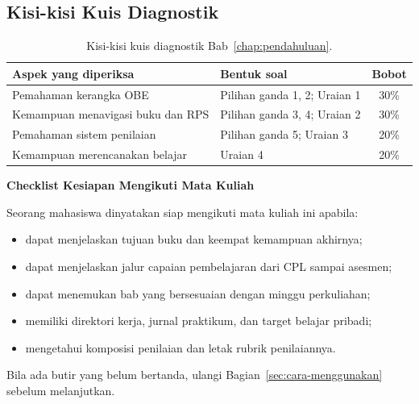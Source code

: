 \subsection{Kisi-kisi Kuis Diagnostik}

\begin{table}[H]
    \centering
    \caption{Kisi-kisi kuis diagnostik Bab~\ref{chap:pendahuluan}.}
    \label{tab:kisi-bab1}
    \small
    \begin{tabular}{@{}p{5.6cm}p{5.0cm}c@{}}
        \toprule
        \textbf{Aspek yang diperiksa} & \textbf{Bentuk soal} &
        \textbf{Bobot} \\
        \midrule
        Pemahaman kerangka OBE & Pilihan ganda 1, 2; Uraian 1 &
        30\% \\
        \addlinespace
        Kemampuan menavigasi buku dan RPS & Pilihan ganda 3, 4;
        Uraian 2 & 30\% \\
        \addlinespace
        Pemahaman sistem penilaian & Pilihan ganda 5; Uraian 3 &
        20\% \\
        \addlinespace
        Kemampuan merencanakan belajar & Uraian 4 & 20\% \\
        \bottomrule
    \end{tabular}
\end{table}

\begin{checklistbox}
\textbf{Checklist Kesiapan Mengikuti Mata Kuliah}

Seorang mahasiswa dinyatakan siap mengikuti mata kuliah ini apabila:
\begin{itemize}
    \item[\checked] dapat menjelaskan tujuan buku dan keempat
          kemampuan akhirnya;
    \item[\checked] dapat menjelaskan jalur capaian pembelajaran dari
          CPL sampai asesmen;
    \item[\checked] dapat menemukan bab yang bersesuaian dengan
          minggu perkuliahan;
    \item[\checked] memiliki direktori kerja, jurnal praktikum, dan
          target belajar pribadi;
    \item[\checked] mengetahui komposisi penilaian dan letak rubrik
          penilaiannya.
\end{itemize}

\vspace{0.4em}
Bila ada butir yang belum bertanda, ulangi Bagian~\ref{sec:cara-menggunakan}
sebelum melanjutkan.
\end{checklistbox}
